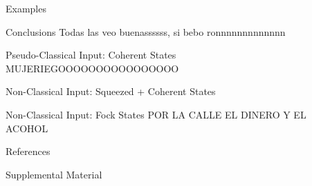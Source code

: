 \documentclass[final]{beamer}
\newlength{\sepwidth}
\newlength{\colwidth}
\newcommand{\separatorcolumn}{\begin{column}{\sepwidth}\end{column}}
\begin{document}
\begin{frame}[t]
\begin{columns}[t]
\begin{column}{\colwidth}
\end{column}

\separatorcolumn

\begin{column}{\colwidth}


\begin{block}{Examples}



\end{block}

   \begin{block}{Conclusions}
     Todas las veo buenassssss, si bebo ronnnnnnnnnnnnn
  \end{block}


  \begin{exampleblock}{Pseudo-Classical Input: Coherent States}
MUJERIEGOOOOOOOOOOOOOOOO

  \end{exampleblock}


  \begin{exampleblock}{Non-Classical Input: Squeezed + Coherent States}

  \end{exampleblock}


  \begin{exampleblock}{Non-Classical Input: Fock States}
POR LA CALLE EL DINERO Y EL ACOHOL
  \end{exampleblock}


  \begin{block}{References}

    \nocite{*}
    \footnotesize{}

  \end{block}

  \begin{block}{Supplemental Material}

    

  \end{block}

\end{column}
\separatorcolumn
\end{columns}
\end{frame}
\end{document}
